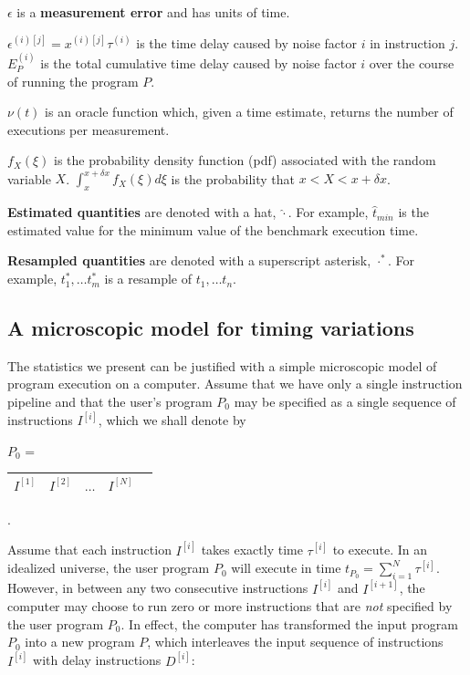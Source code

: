 \documentclass[conference]{IEEEtran}
\begin{document}
$\epsilon$ is a \textbf{measurement error} and has units of time.

$\epsilon^{(i)[j]} = x^{(i)[j]} \tau^{(i)}$ is the time delay caused by noise factor $i$ in instruction $j$. $E_P^{(i)}$ is the total cumulative time delay caused by noise factor $i$ over the course of running the program $P$.

$\nu(t)$ is an oracle function which, given a time estimate, returns the number of executions per measurement.

$f_X(\xi)$ is the probability density function (pdf) associated with the random variable $X$. $\int_{x}^{x+\delta x} f_X(\xi) d\xi$ is the probability that $x < X < x+\delta x$.

\textbf{Estimated quantities} are denoted with a hat, $\hat\cdot$. For example, $\hat t_{min}$ is the estimated value for the minimum value of the benchmark execution time.

\textbf{Resampled quantities} are denoted with a superscript asterisk, $\cdot^*$. For example, $t^*_1, \dots t^*_m$ is a resample of $t_1, \dots t_n$.


\label{sec:statmodel}
\subsection{A microscopic model for timing variations}

The statistics we present can be justified with a simple microscopic
model of program execution on a computer.
Assume that we have only a single instruction pipeline
and that the user's program $P_0$ may be specified as a single sequence of instructions
$I^{[i]}$, which we shall denote by

$P_0$ = \begin{tabular}{|c|c|c|c|c|}
\hline
$I^{[1]}$ & $I^{[2]}$ & $\dots$ & $I^{[N]}$ \tabularnewline
\hline
\end{tabular}.

Assume that each instruction $I^{[i]}$ takes exactly time $\tau^{[i]}$ to execute.
In an idealized universe, the user program $P_0$ will execute in time
$t_{P_0} = \sum_{i=1}^N \tau^{[i]}$.
However, in between any two consecutive instructions $I^{[i]}$ and $I^{[i+1]}$,
the computer may choose to run zero or more instructions that are \textit{not}
specified by the user program $P_0$. In effect, the computer has transformed the
input program $P_0$ into a new program $P$, which interleaves the input sequence
of instructions $I^{[i]}$ with delay instructions $D^{[i]}$:
\end{document}
